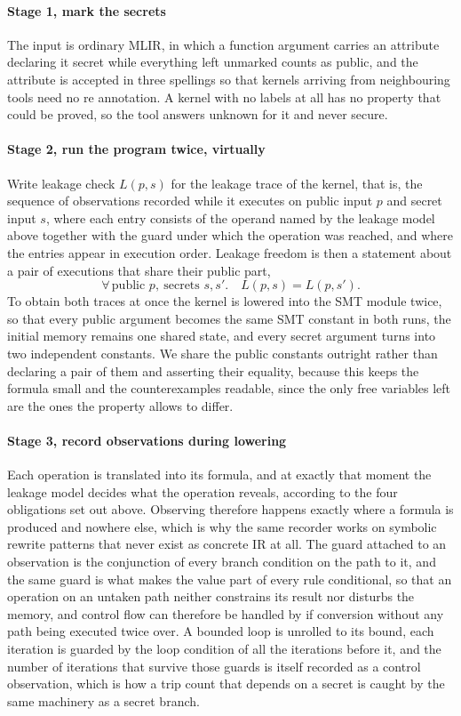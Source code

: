 \paragraph{Stage 1, mark the secrets}
The input is ordinary MLIR, in which a function argument carries an attribute declaring it secret while everything left unmarked counts as public, and the attribute is accepted in three spellings so that kernels arriving from neighbouring tools need no re annotation.
A kernel with no labels at all has no property that could be proved, so the tool answers unknown for it and never secure.
\paragraph{Stage 2, run the program twice, virtually}
Write leakage check $L(p,s)$ for the leakage trace of the kernel, that is, the sequence of observations recorded while it executes on public input $p$ and secret input $s$, where each entry consists of the operand named by the leakage model above together with the guard under which the operation was reached, and where the entries appear in execution order.
Leakage freedom is then a statement about a pair of executions that share their public part, \[ \forall\, \text{public } p,\ \text{secrets } s, s'. \quad L(p,s) = L(p,s'). \] To obtain both traces at once the kernel is lowered into the SMT module twice, so that every public argument becomes the same SMT constant in both runs, the initial memory remains one shared state, and every secret argument turns into two independent constants.
We share the public constants outright rather than declaring a pair of them and asserting their equality, because this keeps the formula small and the counterexamples readable, since the only free variables left are the ones the property allows to differ.
\paragraph{Stage 3, record observations during lowering}
Each operation is translated into its formula, and at exactly that moment the leakage model decides what the operation reveals, according to the four obligations set out above.
Observing therefore happens exactly where a formula is produced and nowhere else, which is why the same recorder works on symbolic rewrite patterns that never exist as concrete IR at all.
The guard attached to an observation is the conjunction of every branch condition on the path to it, and the same guard is what makes the value part of every rule conditional, so that an operation on an untaken path neither constrains its result nor disturbs the memory, and control flow can therefore be handled by if conversion without any path being executed twice over.
A bounded loop is unrolled to its bound, each iteration is guarded by the loop condition of all the iterations before it, and the number of iterations that survive those guards is itself recorded as a control observation, which is how a trip count that depends on a secret is caught by the same machinery as a secret branch.
